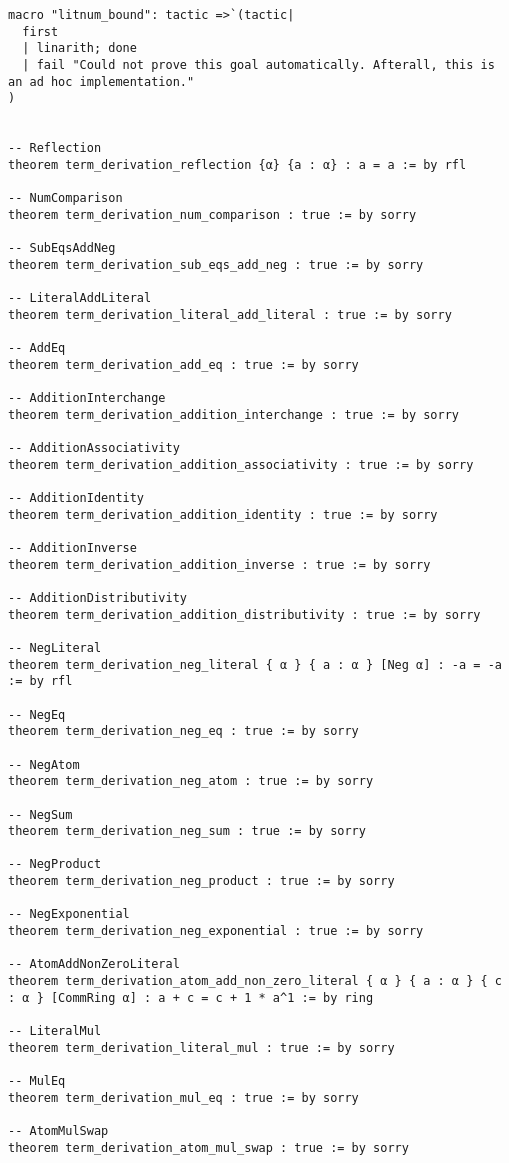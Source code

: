 \documentclass{article}
\begin{document}
\begin{tcolorbox}[colback=white!10, width=\linewidth]
\begin{lstlisting}[language=Lean4]
macro "litnum_bound": tactic =>`(tactic|
  first
  | linarith; done
  | fail "Could not prove this goal automatically. Afterall, this is an ad hoc implementation."
)


-- Reflection
theorem term_derivation_reflection {α} {a : α} : a = a := by rfl

-- NumComparison
theorem term_derivation_num_comparison : true := by sorry

-- SubEqsAddNeg
theorem term_derivation_sub_eqs_add_neg : true := by sorry

-- LiteralAddLiteral
theorem term_derivation_literal_add_literal : true := by sorry

-- AddEq
theorem term_derivation_add_eq : true := by sorry

-- AdditionInterchange
theorem term_derivation_addition_interchange : true := by sorry

-- AdditionAssociativity
theorem term_derivation_addition_associativity : true := by sorry

-- AdditionIdentity
theorem term_derivation_addition_identity : true := by sorry

-- AdditionInverse
theorem term_derivation_addition_inverse : true := by sorry

-- AdditionDistributivity
theorem term_derivation_addition_distributivity : true := by sorry

-- NegLiteral
theorem term_derivation_neg_literal { α } { a : α } [Neg α] : -a = -a := by rfl

-- NegEq
theorem term_derivation_neg_eq : true := by sorry

-- NegAtom
theorem term_derivation_neg_atom : true := by sorry

-- NegSum
theorem term_derivation_neg_sum : true := by sorry

-- NegProduct
theorem term_derivation_neg_product : true := by sorry

-- NegExponential
theorem term_derivation_neg_exponential : true := by sorry

-- AtomAddNonZeroLiteral
theorem term_derivation_atom_add_non_zero_literal { α } { a : α } { c : α } [CommRing α] : a + c = c + 1 * a^1 := by ring

-- LiteralMul
theorem term_derivation_literal_mul : true := by sorry

-- MulEq
theorem term_derivation_mul_eq : true := by sorry

-- AtomMulSwap
theorem term_derivation_atom_mul_swap : true := by sorry


\end{lstlisting}
\end{tcolorbox}
\end{document}
